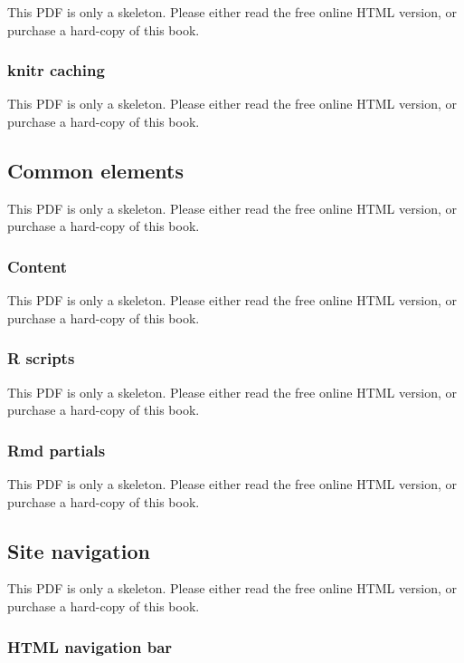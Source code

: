 \documentclass[
  11pt,
]{krantz}
\theoremstyle{definition}
\theoremstyle{definition}
\theoremstyle{definition}
\theoremstyle{definition}
\theoremstyle{remark}
\begin{document}
This PDF is only a skeleton. Please either read the free online HTML version, or purchase a hard-copy of this book.

\subsubsection{knitr caching}\label{knitr-caching}

This PDF is only a skeleton. Please either read the free online HTML version, or purchase a hard-copy of this book.

\subsection{Common elements}\label{common-elements}

This PDF is only a skeleton. Please either read the free online HTML version, or purchase a hard-copy of this book.

\subsubsection{Content}\label{content}

This PDF is only a skeleton. Please either read the free online HTML version, or purchase a hard-copy of this book.

\subsubsection{R scripts}\label{r-scripts}

This PDF is only a skeleton. Please either read the free online HTML version, or purchase a hard-copy of this book.

\subsubsection{Rmd partials}\label{rmd-partials}

This PDF is only a skeleton. Please either read the free online HTML version, or purchase a hard-copy of this book.

\subsection{Site navigation}\label{site-navigation}

This PDF is only a skeleton. Please either read the free online HTML version, or purchase a hard-copy of this book.

\subsubsection{HTML navigation bar}\label{html-navigation-bar}
\end{document}
